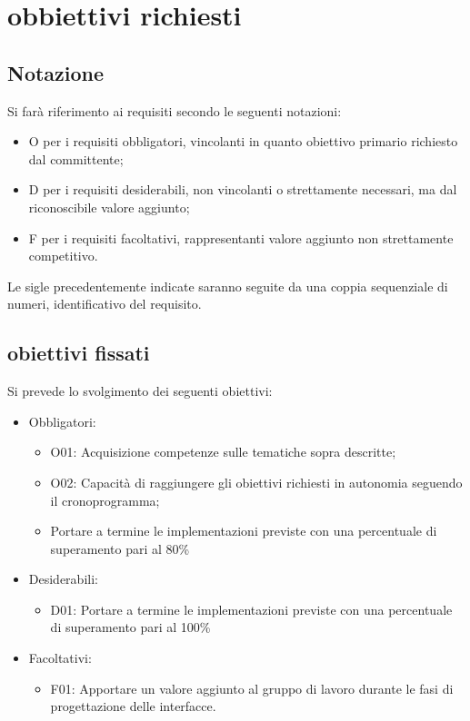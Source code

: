 \section{obbiettivi richiesti}
\subsection{Notazione}
Si farà riferimento ai requisiti secondo le seguenti notazioni:
\begin{itemize}
    \item O per i requisiti obbligatori, vincolanti in quanto obiettivo primario richiesto dal committente;
    \item D per i requisiti desiderabili, non vincolanti o strettamente necessari, ma dal riconoscibile valore
    aggiunto;
    \item F per i requisiti facoltativi, rappresentanti valore aggiunto non strettamente competitivo.
\end{itemize}
Le sigle precedentemente indicate saranno seguite da una coppia sequenziale di numeri, identificativo del
requisito.
\subsection{obiettivi fissati}
Si prevede lo svolgimento dei seguenti obiettivi:
\begin{itemize}
    \item Obbligatori:
    \begin{itemize}
        \item O01: Acquisizione competenze sulle tematiche sopra descritte;
        \item O02: Capacità di raggiungere gli obiettivi richiesti in autonomia seguendo il cronoprogramma;
        \item Portare a termine le implementazioni previste con una percentuale di superamento pari al 80\%        
    \end{itemize}
    \item Desiderabili:
     \begin{itemize}
        \item D01: Portare a termine le implementazioni previste con una percentuale di superamento pari al 100\%
     \end{itemize}
     \item Facoltativi:
     \begin{itemize}
        \item F01: Apportare un valore aggiunto al gruppo di lavoro durante le fasi di progettazione delle interfacce.
     \end{itemize}
\end{itemize}
